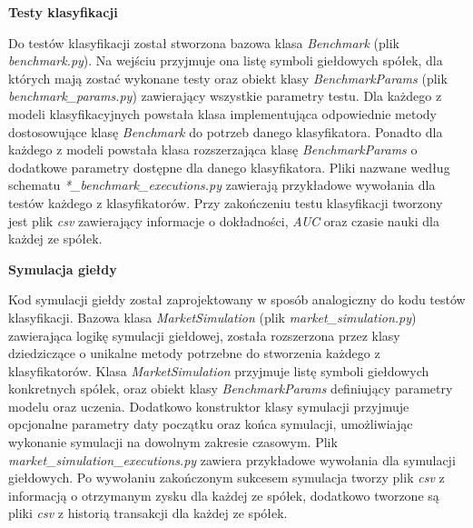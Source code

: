 \documentclass[a4paper, twoside, 11pt, openright]{article}
\begin{document}
\newpage

\textbf{Testy klasyfikacji}

Do testów klasyfikacji został stworzona bazowa klasa \textit{Benchmark} (plik \textit{benchmark.py}). Na wejściu przyjmuje ona listę symboli giełdowych spółek, dla których mają zostać wykonane testy oraz obiekt klasy \textit{BenchmarkParams} (plik \textit{benchmark\_params.py}) zawierający wszystkie parametry testu. Dla każdego z modeli klasyfikacyjnych powstała klasa implementująca odpowiednie metody dostosowujące klasę \textit{Benchmark} do potrzeb danego klasyfikatora. Ponadto dla każdego z modeli powstała klasa rozszerzająca klasę \textit{BenchmarkParams} o dodatkowe parametry dostępne dla danego klasyfikatora. Pliki nazwane według schematu \textit{*\_benchmark\_executions.py} zawierają przykładowe wywołania dla testów każdego z klasyfikatorów.  Przy zakończeniu testu klasyfikacji tworzony jest plik \textit{csv} zawierający informacje o dokładności, \textit{AUC} oraz czasie nauki dla każdej ze spółek.

\bigskip

\textbf{Symulacja giełdy}

Kod symulacji giełdy został zaprojektowany w sposób analogiczny do kodu testów klasyfikacji. Bazowa klasa \textit{MarketSimulation} (plik \textit{market\_simulation.py}) zawierająca logikę symulacji giełdowej, została rozszerzona przez klasy dziedziczące o unikalne metody potrzebne do stworzenia każdego z klasyfikatorów. Klasa \textit{MarketSimulation} przyjmuje listę symboli giełdowych konkretnych spółek, oraz obiekt klasy \textit{BenchmarkParams} definiujący parametry modelu oraz uczenia. Dodatkowo konstruktor klasy symulacji przyjmuje opcjonalne parametry daty początku oraz końca symulacji, umożliwiając wykonanie symulacji na dowolnym zakresie czasowym. Plik \textit{market\_simulation\_executions.py} zawiera przykładowe wywołania dla symulacji giełdowych. Po wywołaniu zakończonym sukcesem symulacja tworzy plik \textit{csv} z informacją o otrzymanym zysku dla każdej ze spółek, dodatkowo tworzone są pliki \textit{csv} z historią transakcji dla każdej ze spółek.
\end{document}
